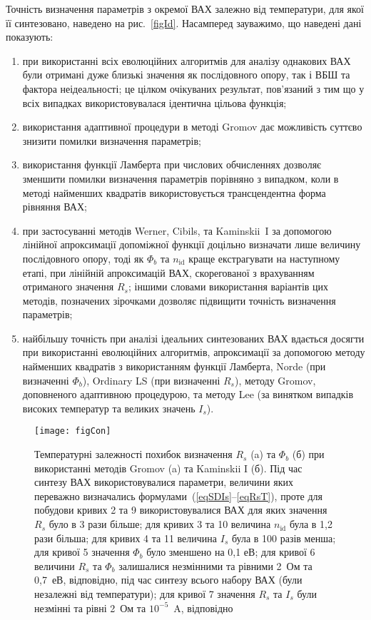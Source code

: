 Точність визначення параметрів з окремої ВАХ залежно від температури, для якої її синтезовано, наведено на рис.~\ref{figId}.
Насамперед зауважимо, що наведені дані показують:
\begin{enumerate}[label=\asbuk*),leftmargin=0em,itemindent=1.5em]
\item при використанні всіх еволюційних алгоритмів для аналізу однакових ВАХ були отримані дуже близькі значення як послідовного опору, так і ВБШ та фактора неідеальності;
це цілком очікуваних результат, пов'язаний з тим що у всіх випадках використовувалася ідентична цільова функція;
\item використання адаптивної процедури в методі Gromov дає можливість суттєво знизити помилки визначення параметрів;
\item використання функції Ламберта при числових обчисленнях дозволяє зменшити помилки визначення параметрів порівняно з випадком, коли в методі найменших квадратів використовується трансцендентна форма рівняння ВАХ;
\item при застосуванні методів Werner, Cibils, та Kaminskii~I за допомогою лінійної апроксимації допоміжної функції доцільно визначати лише величину послідовного опору,
тоді як $\Phi_b$ та $n_\mathrm{id}$ краще екстрагувати на наступному етапі, при лінійній апроксимацій ВАХ, скорегованої з врахуванням  отриманого значення $R_s$;
іншими словами використання варіантів цих методів, позначених зірочками дозволяє підвищити точність визначення параметрів;
\item найбільшу точність при аналізі ідеальних синтезованих ВАХ вдається досягти при використанні еволюційних алгоритмів, апроксимації за допомогою методу найменших квадратів з використанням функції Ламберта, Norde (при визначенні $\Phi_b$), Ordinary LS (при визначенні $R_s$), методу Gromov, доповненого адаптивною процедурою, та методу Lee (за винятком випадків високих температур та великих значень $I_s$).
\end{enumerate}




\begin{figure}
\center
\texttt{[image: figCon]}%
\caption{\label{figCon}
Температурні залежності похибок визначення $R_s$ (a) та $\Phi_b$ (б) при використанні методів Gromov (a) та  Kaminskii I (б).
Під час синтезу ВАХ використовувалися параметри, величини яких переважно визначались формулами~(\ref{eqSDIs}--\ref{eqRsT}),
проте для  побудови кривих 2 та 9 використовувалися ВАХ для яких значення $R_s$ було в 3 рази більше;
для кривих 3 та 10 величина $n_\mathrm{id}$ була в 1,2 рази більша;
для кривих 4 та 11 величина $I_s$ була в 100 разів менша;
для кривої 5 значення $\Phi_b$ було зменшено на 0,1 еВ;
для кривої 6 величини $R_s$ та $\Phi_b$ залишалися незмінними та рівними 2~Ом та 0,7~еВ, відповідно, під час синтезу всього
набору ВАХ (були незалежні від температури);
для кривої 7 значення $R_s$ та $I_s$ були незмінні та рівні 2~Ом та $10^{-5}$~A, відповідно
}
\end{figure}


